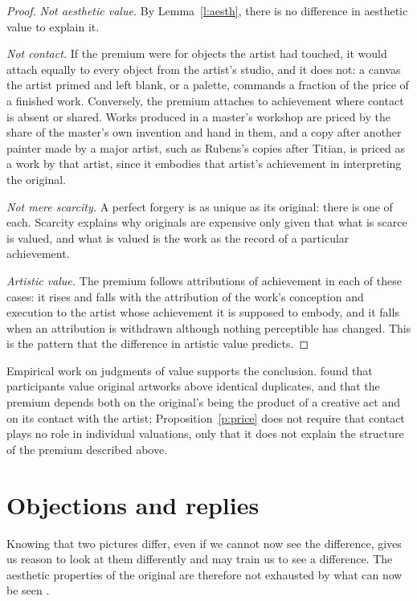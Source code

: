 \documentclass{situationist-preprint}
\begin{document}
\begin{proof}
\emph{Not aesthetic value.} By Lemma~\ref{l:aesth}, there is no difference in aesthetic value to explain it.

\emph{Not contact.} If the premium were for objects the artist had touched, it would attach equally to every object from the artist's studio, and it does not: a canvas the artist primed and left blank, or a palette, commands a fraction of the price of a finished work. Conversely, the premium attaches to achievement where contact is absent or shared. Works produced in a master's workshop are priced by the share of the master's own invention and hand in them, and a copy after another painter made by a major artist, such as Rubens's copies after Titian, is priced as a work by that artist, since it embodies that artist's achievement in interpreting the original.

\emph{Not mere scarcity.} A perfect forgery is as unique as its original: there is one of each. Scarcity explains why originals are expensive only given that what is scarce is valued, and what is valued is the work as the record of a particular achievement.

\emph{Artistic value.} The premium follows attributions of achievement in each of these cases: it rises and falls with the attribution of the work's conception and execution to the artist whose achievement it is supposed to embody, and it falls when an attribution is withdrawn although nothing perceptible has changed. This is the pattern that the difference in artistic value predicts.
\end{proof}

Empirical work on judgments of value supports the conclusion. \citet{NewmanBloom2012} found that participants value original artworks above identical duplicates, and that the premium depends both on the original's being the product of a creative act and on its contact with the artist; Proposition~\ref{p:price} does not require that contact plays no role in individual valuations, only that it does not explain the structure of the premium described above.

\section{Objections and replies}

\begin{objection}[Goodman]\label{o:good}
Knowing that two pictures differ, even if we cannot now see the difference, gives us reason to look at them differently and may train us to see a difference. The aesthetic properties of the original are therefore not exhausted by what can now be seen \citep{Goodman1968}.
\end{objection}
\end{document}
